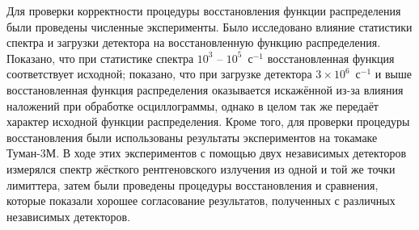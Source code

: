 Для проверки корректности процедуры восстановления функции распределения были проведены численные эксперименты. Было исследовано влияние статистики спектра и загрузки детектора на восстановленную функцию распределения. Показано, что при статистике спектра $10^3$ -- $10^5$~с${}^{-1}$ восстановленная функция соответствует исходной; показано, что при загрузке детектора $3 \times 10^6$~с${}^{-1}$ и выше восстановленная функция распределения оказывается искажённой из-за влияния наложений при обработке осциллограммы, однако в целом так же передаёт характер исходной функции распределения. Кроме того, для проверки процедуры восстановления были использованы результаты экспериментов на токамаке Туман-3М. В ходе этих экспериментов с помощью двух независимых детекторов измерялся спектр жёсткого рентгеновского излучения из одной и той же точки лимиттера, затем были проведены процедуры восстановления и сравнения, которые показали хорошее согласование результатов, полученных с различных независимых детекторов.


\FloatBarrier
